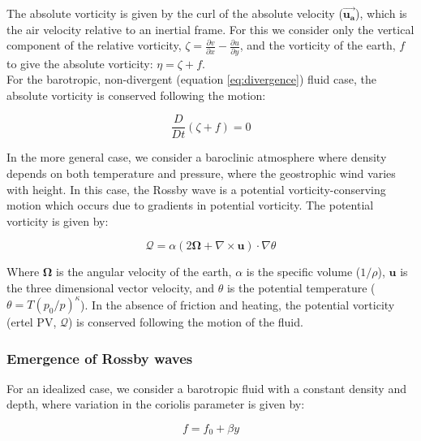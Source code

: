 \documentclass{article}
\begin{document}
The absolute vorticity is given by the curl of the absolute velocity ($\mathbf{\vec{u_a}}$), which is the air velocity relative to an inertial frame. For this we consider only the vertical component of the relative vorticity, $\zeta = \frac{\partial v}{\partial x} - \frac{\partial u}{\partial y}$, and the vorticity of the earth, $f$ to give the absolute vorticity: $\eta = \zeta + f$.\\

For the barotropic, non-divergent (equation \ref{eq:divergence}) fluid case, the absolute vorticity is conserved following the motion:

\begin{equation}
    \frac{D}{Dt}(\zeta + f) = 0
    \label{eq:conservation_of_absolute_vorticity}
\end{equation}


In the more general case, we consider a baroclinic atmosphere where density depends on both temperature and pressure, where the geostrophic wind varies with height. In this case, the Rossby wave is a potential vorticity-conserving motion which occurs due to gradients in potential vorticity. The potential vorticity is given by:

\begin{equation}
    \mathcal{Q} = \alpha (2 \mathbf{\Omega} + \nabla \times \mathbf{u}) \cdot \nabla \theta
    \label{eq:potential_vorticity}
\end{equation}

Where $\mathbf{\Omega}$ is the angular velocity of the earth, $\alpha$ is the specific volume ($1/\rho$), $\mathbf{u}$ is the three dimensional vector velocity, and $\theta$ is the potential temperature ($\theta = T (p_0/p)^{\kappa}$). In the absence of friction and heating, the potential vorticity (ertel PV, $\mathcal{Q}$) is conserved following the motion of the fluid.\\

\subsubsection*{Emergence of Rossby waves}

For an idealized case, we consider a barotropic fluid with a constant density and depth, where variation in the coriolis parameter is given by:

\begin{equation}
    f = f_0 + \beta y
    \label{eq:coriolis_parameter}
\end{equation}
\end{document}
